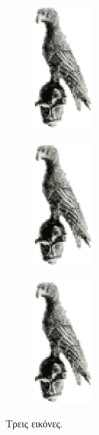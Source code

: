 \begin{figure}[t]
	\centering
	\begin{subfigure}[t]{0.3\textwidth}
		\centering
		\includegraphics[width=0.25\textwidth]{Figures/bird.eps}
		\caption{}
		\label{subfig:ThreeBirdsA}
	\end{subfigure}
	\hfill
	\begin{subfigure}[t]{0.3\textwidth}
		\centering
		\includegraphics[width=0.25\textwidth]{Figures/bird.eps}
		\caption{}
		\label{subfig:ThreeBirdsB}
	\end{subfigure}
	\hfill
	\begin{subfigure}[t]{0.3\textwidth}
		\centering
		\includegraphics[width=0.25\textwidth]{Figures/bird.eps}
		\caption{}
		\label{subfig:ThreeBirdsC}
	\end{subfigure}
	\caption{Τρεις εικόνες.}
	\label{fig:ThreeBirds}
\end{figure}

